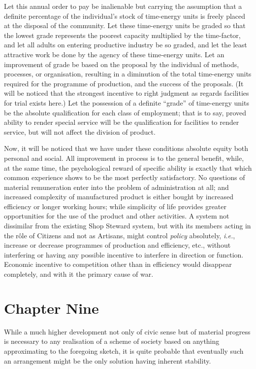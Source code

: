 \documentclass{book}
\begin{document}
Let this annual order to pay be inalienable but carrying the assumption that a definite percentage of the individual’s stock of time-energy units is freely placed at the disposal of the community. Let these time-energy units be graded so that the lowest grade represents the poorest capacity multiplied by the time-factor, and let all adults on entering productive industry be so graded, and let the least attractive work be done by the agency of these time-energy units. Let an improvement of grade be based on the proposal by the individual of methods, processes, or organisation, resulting in a diminution of the total time-energy units required for the programme of production, and the success of the proposals. (It will be noticed that the strongest incentive to right judgment as regards facilities for trial exists here.) Let the possession of a definite “grade” of time-energy units be the absolute qualification for each class of employment; that is to say, proved ability to render special service will be the qualification for facilities to render service, but will not affect the division of product.

Now, it will be noticed that we have under these conditions absolute equity both personal and social. All improvement in process is to the general benefit, while, at the same time, the psychological reward of specific ability is exactly that which common experience shows to be the most perfectly satisfactory. No questions of material remuneration enter into the problem of administration at all; and increased complexity of manufactured product is either bought by increased efficiency or longer working hours; while simplicity of life provides greater opportunities for the use of the product and other activities. A system not dissimilar from the existing Shop Steward system, but with its members acting in the rôle of Citizens and not as Artisans, might control \emph{policy} absolutely, \emph{i.e.}, increase or decrease programmes of production and efficiency, etc., without interfering or having any possible incentive to interfere in direction or function. Economic incentive to competition other than in efficiency would disappear completely, and with it the primary cause of war.

\chapter{Chapter Nine}
\label{chapter-9}
While a much higher development not only of civic sense but of material progress is necessary to any realisation of a scheme of society based on anything approximating to the foregoing sketch, it is quite probable that eventually such an arrangement might be the only solution having inherent stability.
\end{document}
